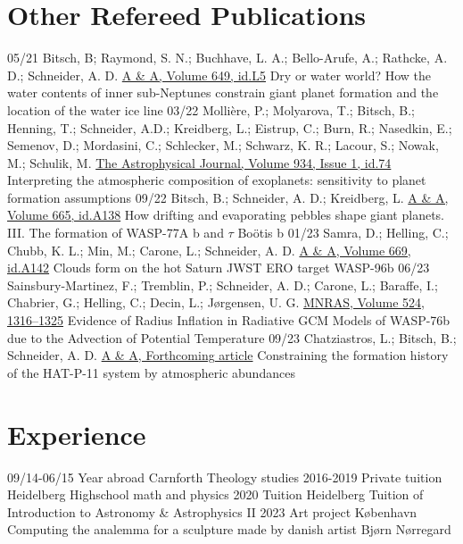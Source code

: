 \documentclass[]{friggeri-cv}
\begin{document}
\section{Other Refereed Publications}
\begin{entrylist}
  \entry
    {05/21}
    {Bitsch, B; Raymond, S. N.; Buchhave, L. A.; Bello-Arufe, A.; Rathcke, A. D.; Schneider, A. D.}
    {\href{https://arxiv.org/abs/2104.11631}{A \& A, Volume 649, id.L5}}
    {Dry or water world? How the water contents of inner sub-Neptunes constrain giant planet formation and the location of the water ice line}
  \entry
    {03/22}
    {Mollière, P.; Molyarova, T.; Bitsch, B.; Henning, T.; Schneider, A.D.; Kreidberg, L.; Eistrup, C.; Burn, R.; Nasedkin, E.; Semenov, D.; Mordasini, C.; Schlecker, M.; Schwarz, K. R.; Lacour, S.; Nowak, M.; Schulik, M.}
    {\href{https://arxiv.org/abs/2204.13714}{The Astrophysical Journal, Volume 934, Issue 1, id.74}}
    {Interpreting the atmospheric composition of exoplanets: sensitivity to planet formation assumptions}
  \entry
  	{09/22}
  	{Bitsch, B.; Schneider, A. D.; Kreidberg, L.}
  	{\href{https://arxiv.org/abs/2207.06077}{A \& A, Volume 665, id.A138}}
  	{How drifting and evaporating pebbles shape giant planets. III. The formation of WASP-77A b and \(\tau \) Boötis b}
  \entry
  	{01/23}
  	{{Samra}, D.; {Helling}, C.; {Chubb}, K. L.; {Min}, M.; {Carone}, L.; {Schneider}, A. D.}
  	{\href{https://arxiv.org/abs/2211.00633}{A \& A, Volume 669, id.A142}}
  	{Clouds form on the hot Saturn JWST ERO target WASP-96b}	
  \entry
  	{06/23}
  	{{Sainsbury-Martinez}, F.; {Tremblin}, P.; {Schneider}, A. D.; {Carone}, L.; {Baraffe}, I.; {Chabrier}, G.; {Helling}, C.; {Decin}, L.; {J{\o}rgensen}, U. G.}
  	{\href{https://arxiv.org/abs/2306.12352}{MNRAS, Volume 524, 1316–1325}}
  	{Evidence of Radius Inflation in Radiative GCM Models of WASP-76b due to the Advection of Potential Temperature}
  \entry
  	{09/23}
  	{{Chatziastros}, L.; {Bitsch}, B.; {Schneider}, A. D.}
  	{\href{https://arxiv.org/abs/2310.12797}{A \& A, Forthcoming article}}
  	{Constraining the formation history of the HAT-P-11 system by atmospheric abundances}
\end{entrylist}
\newpage
\section{Experience}
\begin{entrylist}
	\entry
    {09/14-06/15}
    {Year abroad}
    {Carnforth}
    {Theology studies}
	\entry
    {2016-2019}
    {Private tuition}
    {Heidelberg}
    {Highschool math and physics}
    \entry
    {2020}
    {Tuition}
    {Heidelberg}
    {Tuition of Introduction to Astronomy \& Astrophysics II}
    \entry
    {2023}
    {Art project}
    {K{\o}benhavn}
    {Computing the analemma for a sculpture made by danish artist Bj{\o}rn N{\o}rregard}

\end{entrylist}
\end{document}
